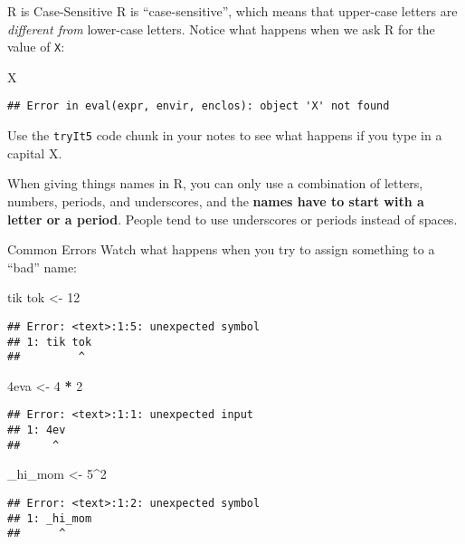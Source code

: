 \documentclass[
  ignorenonframetext,
]{beamer}
\newenvironment{Shaded}{\begin{snugshade}}{\end{snugshade}}
\newcommand{\DecValTok}[1]{\textcolor[rgb]{0.00,0.00,0.81}{#1}}
\newcommand{\NormalTok}[1]{#1}
\newcommand{\OtherTok}[1]{\textcolor[rgb]{0.56,0.35,0.01}{#1}}
\newcommand{\SpecialCharTok}[1]{\textcolor[rgb]{0.81,0.36,0.00}{\textbf{#1}}}
\begin{document}
\begin{frame}[fragile]{R is Case-Sensitive}
\label{r-is-case-sensitive}
R is ``case-sensitive'', which means that upper-case letters are
\emph{different from} lower-case letters. Notice what happens when we
ask R for the value of \texttt{X}:

\begin{Shaded}
\begin{Highlighting}[]
\NormalTok{X}
\end{Highlighting}
\end{Shaded}

\begin{verbatim}
## Error in eval(expr, envir, enclos): object 'X' not found
\end{verbatim}

Use the \texttt{tryIt5} code chunk in your notes to see what happens if
you type in a capital X.

When giving things names in R, you can only use a combination of
letters, numbers, periods, and underscores, and the \textbf{names have
to start with a letter or a period}. People tend to use underscores or
periods instead of spaces.
\end{frame}

\begin{frame}[fragile]{Common Errors}
\label{common-errors}
Watch what happens when you try to assign something to a ``bad'' name:

\small

\begin{Shaded}
\begin{Highlighting}[]
\NormalTok{tik tok }\OtherTok{\textless{}{-}} \DecValTok{12}
\end{Highlighting}
\end{Shaded}

\begin{verbatim}
## Error: <text>:1:5: unexpected symbol
## 1: tik tok
##         ^
\end{verbatim}

\begin{Shaded}
\begin{Highlighting}[]
\DecValTok{4}\NormalTok{eva }\OtherTok{\textless{}{-}} \DecValTok{4} \SpecialCharTok{*} \DecValTok{2}
\end{Highlighting}
\end{Shaded}

\begin{verbatim}
## Error: <text>:1:1: unexpected input
## 1: 4ev
##     ^
\end{verbatim}

\begin{Shaded}
\begin{Highlighting}[]
\NormalTok{\_hi\_mom }\OtherTok{\textless{}{-}} \DecValTok{5}\SpecialCharTok{\^{}}\DecValTok{2}
\end{Highlighting}
\end{Shaded}

\begin{verbatim}
## Error: <text>:1:2: unexpected symbol
## 1: _hi_mom
##      ^
\end{verbatim}
\end{frame}
\end{document}
